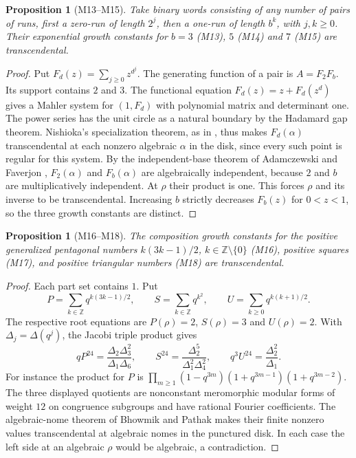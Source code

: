 \documentclass[11pt,a4paper]{article}
\newtheorem{proposition}[theorem]{Proposition}
\theoremstyle{definition}
\theoremstyle{remark}
\begin{document}
\par\hypertarget{cat-M13}{}\label{page:M13}\hypertarget{cat-M14}{}\label{page:M14}\hypertarget{cat-M15}{}\label{page:M15}
\begin{proposition}[M13--M15]
Take binary words consisting of any number of pairs of runs, first a zero-run
of length $2^j$, then a one-run of length $b^k$, with $j,k\ge0$.
Their exponential growth constants for $b=3$ (M13), $5$ (M14) and $7$
(M15) are transcendental.
\end{proposition}
\begin{proof}
Put $F_d(z)=\sum_{j\ge0}z^{d^j}$. The generating function of a pair is
$A=F_2F_b$. Its support contains $2$ and $3$.
The functional equation $F_d(z)=z+F_d(z^d)$ gives a Mahler system for
$(1,F_d)$ with polynomial matrix and determinant one. The power series
has the unit circle as a natural boundary by the Hadamard gap theorem.
Nishioka's specialization theorem, as in \cite{mMahler}, thus makes
$F_d(\alpha)$ transcendental at each nonzero algebraic $\alpha$ in the disk, since every such point is regular for this system. By the independent-base
theorem of Adamczewski and Faverjon \cite[Theorem~1.1(ii)]{mMahler},
$F_2(\alpha)$ and $F_b(\alpha)$ are algebraically independent, because
$2$ and $b$ are multiplicatively independent. At $\rho$ their product is
one. This forces $\rho$ and its inverse to be transcendental.
Increasing $b$ strictly decreases $F_b(z)$ for $0<z<1$, so the three
growth constants are distinct.
\end{proof}

\par\hypertarget{cat-M16}{}\label{page:M16}\hypertarget{cat-M17}{}\label{page:M17}\hypertarget{cat-M18}{}\label{page:M18}
\begin{proposition}[M16--M18]
The composition growth constants for the positive generalized pentagonal
numbers $k(3k-1)/2$, $k\in\mathbb Z\setminus\{0\}$ (M16),
positive squares (M17), and positive triangular numbers (M18) are transcendental.
\end{proposition}
\begin{proof}
Each part set contains $1$. Put
\[
 P=\sum_{k\in\mathbb Z}q^{k(3k-1)/2},\qquad
 S=\sum_{k\in\mathbb Z}q^{k^2},\qquad
 U=\sum_{k\ge0}q^{k(k+1)/2}.
\]
The respective root equations are $P(\rho)=2$, $S(\rho)=3$ and $U(\rho)=2$.
With $\Delta_j=\Delta(q^j)$, the Jacobi triple product gives
\[
 qP^{24}=\frac{\Delta_2\Delta_3^2}{\Delta_1\Delta_6},\qquad
 S^{24}=\frac{\Delta_2^5}{\Delta_1^2\Delta_4^2},\qquad
 q^3U^{24}=\frac{\Delta_2^2}{\Delta_1}.
\]
For instance the product for $P$ is
$\prod_{m\ge1}(1-q^{3m})(1+q^{3m-1})(1+q^{3m-2})$.
The three displayed quotients are nonconstant meromorphic modular forms of
weight $12$ on congruence subgroups and have rational Fourier coefficients.
The algebraic-nome theorem of Bhowmik and Pathak
\cite[Theorem~1.8(a)]{mBhowmik} makes their finite nonzero values
transcendental at algebraic nomes in the punctured disk. In each case the
left side at an algebraic $\rho$ would be algebraic, a contradiction.
\end{proof}
\end{document}
